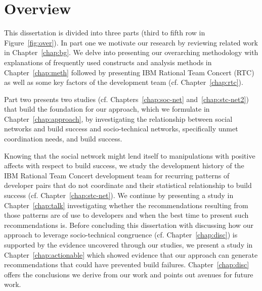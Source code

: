 \section{Overview}
This dissertation is divided into three parts (third to fifth row in Figure~\ref{fig:over}).
In part one we motivate our research by reviewing related work in Chapter~\ref{chap:bg}.
We delve into presenting our overarching methodology with explanations of frequently used constructs and analysis methods in Chapter~\ref{chap:meth} followed by presenting IBM Rational Team Concert (RTC) as well as some key factors of the development team (cf. Chapter~\ref{chap:rtc}).

Part two presents two studies (cf. Chapters~\ref{chap:soc-net} and~\ref{chap:stc-net2}) that build the foundation for our approach, which we formulate in Chapter~\ref{chap:approach}, by investigating the relationship between social networks and build success and socio-technical networks, specifically unmet coordination needs, and build success.

Knowing that the social network might lend itself to manipulations with positive affects with respect to build success, we study the development history of the IBM Rational Team Concert development team for recurring patterns of developer pairs that do not coordinate and their statistical relationship to build success (cf. Chapter~\ref{chap:stc-net}).
We continue by presenting a study in Chapter~\ref{chap:talk} investigating whether the recommendations resulting from those patterns are of use to developers and when the best time to present such recommendations is.
Before concluding this dissertation with discussing how our approach to leverage socio-technical congruence (cf. Chapter~\ref{chap:disc}) is supported by the evidence uncovered through our studies, we present a study in Chapter~\ref{chap:actionable} which showed evidence that our approach can generate recommendations that could have prevented build failures.
Chapter~\ref{chap:disc} offers the conclusions we derive from our work and points out avenues for future work.




















